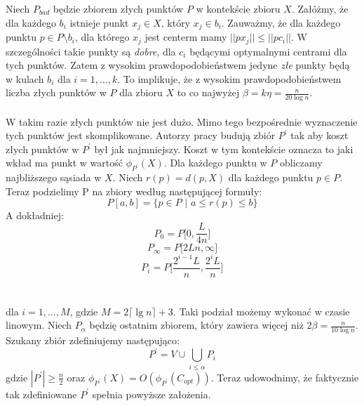 \noindent
Niech $P_{bad}$ będzie zbiorem złych punktów $P$ w kontekście zbioru $X$.
Załóżmy, że dla każdego $b_{i}$ istnieje punkt $x_{j} \in X$, który $x_{j} \in b_{i}$.
Zauważmy, że dla każdego punktu $p \in P \setminus b_{i}$, dla którego $x_{j}$ jest centerm mamy $||px_{j}|| \leq ||pc_{i}||$.
W szczególności takie punkty są \textit{dobre}, dla $c_{i}$ będącymi optymalnymi centrami dla tych punktów.
Zatem z wysokim prawdopodobieństwem jedyne \textit{złe} punkty będą w kulach $b_{i}$ dla $ i = 1, \dots, k$.
To implikuje, że z wysokim prawdopodobieństwem liczba złych punktów w $P$ dla zbioru $X$ to co najwyżej $\beta = k\eta = \frac{n}{20 \log n}$.
\\~\\
W takim razie złych punktów nie jest dużo.
Mimo tego bezpośrednie wyznaczenie tych punktów jest skomplikowane.
Autorzy pracy \cite{10.1145/1007352.1007400} budują zbiór $P^{'}$ tak aby koszt złych punktów w $P^{'}$ był jak najmniejszy.
Koszt w tym kontekście oznacza to jaki wkład ma punkt w wartość $\phi_{P^{'}}(X)$.
Dla każdego punktu w $P$ obliczamy najbliższego sąsiada w $X$.
Niech $r(p) = d(p, X)$ dla każdego punktu $p \in P$.
Teraz podzielimy P na zbiory według następującej formuły:
\begin{equation}
    P[a,b] = \{ p \in P \text{ | } a \leq r(p) \leq b \}
\end{equation}
A dokładniej:
\begin{equation}
    P_{0} = P\Big[0, \frac{L}{4n}\Big]
\end{equation}
\begin{equation}
    P_{ \infty } = P\Big[2Ln, \infty \Big]
\end{equation}
\begin{equation}
    P_{i} = P\Big[ \frac{2^{i-1}L}{n}, \frac{2^{i}L}{n} \Big]
\end{equation}
\\~\\
dla $i = 1, \dots, M$, gdzie $M = 2 \lceil \lg n \rceil + 3$.
Taki podział możemy wykonać w czasie linowym.
Niech $P_{\alpha}$ będzię ostatnim zbiorem, który zawiera więcej niż $2\beta = \frac{n}{10 \log n}$. 
Szukany zbiór zdefiniujemy następująco:
\begin{equation}
    P^{'} = V \cup \bigcup_{i \leq \alpha} P_{i}
\end{equation}
gdzie $|P^{'}| \geq \frac{n}{2}$ oraz $\phi_{P^{'}}(X) = O(\phi_{P^{'}}(C_{opt}))$.
Teraz udowodnimy, że faktycznie tak zdefiniowane $P^{'}$ spełnia powyższe założenia.

